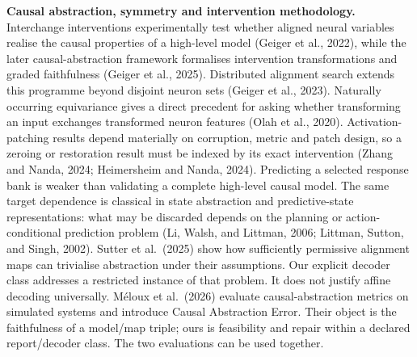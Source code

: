 \documentclass[
  british,
  11pt,
  a4paper,
]{article}
\begin{document}
\textbf{Causal abstraction, symmetry and intervention methodology.}
Interchange interventions experimentally test whether aligned neural
variables realise the causal properties of a high-level model (Geiger et
al., 2022), while the later causal-abstraction framework formalises
intervention transformations and graded faithfulness (Geiger et al.,
2025). Distributed alignment search extends this programme beyond
disjoint neuron sets (Geiger et al., 2023). Naturally occurring
equivariance gives a direct precedent for asking whether transforming an
input exchanges transformed neuron features (Olah et al., 2020).
Activation-patching results depend materially on corruption, metric and
patch design, so a zeroing or restoration result must be indexed by its
exact intervention (Zhang and Nanda, 2024; Heimersheim and Nanda, 2024).
Predicting a selected response bank is weaker than validating a complete
high-level causal model. The same target dependence is classical in
state abstraction and predictive-state representations: what may be
discarded depends on the planning or action-conditional prediction
problem (Li, Walsh, and Littman, 2006; Littman, Sutton, and Singh,
2002). Sutter et al.~(2025) show how sufficiently permissive alignment
maps can trivialise abstraction under their assumptions. Our explicit
decoder class addresses a restricted instance of that problem. It does
not justify affine decoding universally. Méloux et al.~(2026) evaluate
causal-abstraction metrics on simulated systems and introduce Causal
Abstraction Error. Their object is the faithfulness of a model/map
triple; ours is feasibility and repair within a declared report/decoder
class. The two evaluations can be used together.
\end{document}
